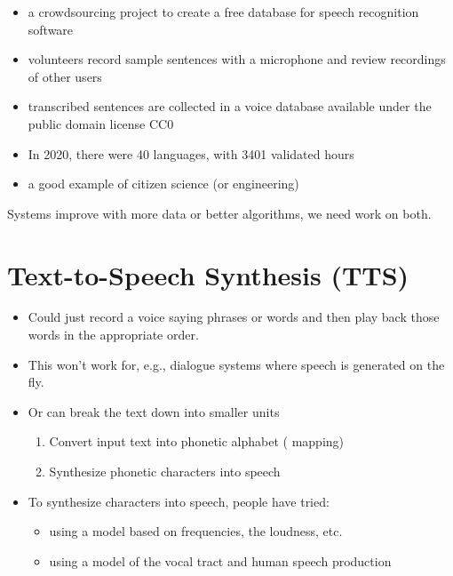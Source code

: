 \documentclass[a4paper,landscape,headrule,footrule,xetex]{foils}
\begin{document}
\begin{itemize}
\item a crowdsourcing project to create a free database for speech
  recognition software
\item volunteers record sample sentences with a microphone and review
  recordings of other users
\item transcribed sentences are collected in a voice database
  available under the public domain license CC0
\item In 2020, there were 40 languages, with 3401 validated hours
\item a good example of citizen science (or engineering)
\end{itemize}

Systems improve with more data or better algorithms, we need work on both.

\section{Text-to-Speech Synthesis (TTS)}

\begin{itemize}
\item Could just record a voice saying phrases or words and then play back those words in the appropriate order.
\item This won't work for, e.g., dialogue systems where speech is generated on the fly.
\item Or can break the text down into smaller units
  \begin{enumerate}
  \item Convert input text into phonetic alphabet ( mapping)
  \item Synthesize phonetic characters into speech 
  \end{enumerate}
\item  To synthesize characters into speech, people have tried:
  \begin{itemize}
  \item using a model based on frequencies, the loudness, etc.
  \item using a model of the vocal tract and human speech production
  \end{itemize}
\end{itemize}

\end{document}
